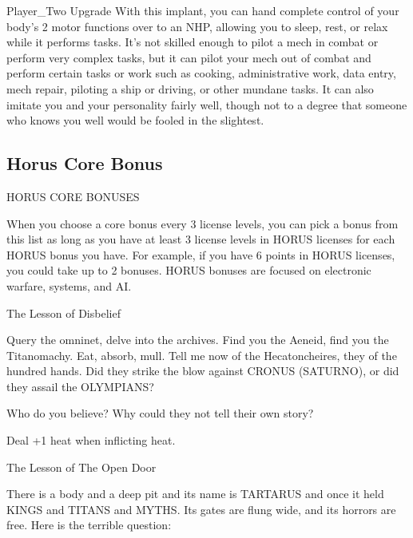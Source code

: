 Player\_Two            Upgrade      With this implant, you can hand complete control of your body’s                   2 
                                   motor functions over to an NHP, allowing you to sleep, rest, or  
                                   relax while it performs tasks. It’s not skilled enough to pilot a  
                                   mech in combat or perform very complex tasks, but it can pilot  
                                   your mech out of combat and perform certain tasks or work such  
                                   as cooking, administrative work, data entry, mech repair, piloting a  
                                   ship or driving, or other mundane tasks. It can also imitate you  
                                   and your personality fairly well, though not to a degree that  
                                   someone who knows you well would be fooled in the slightest. 

                                                                                                                          
\subsection{Horus Core Bonus}

                                      HORUS CORE BONUSES  

When you choose a core bonus every 3 license levels, you can pick a bonus from this list as long  
as you have at least 3 license levels in HORUS licenses for each HORUS bonus you have. For  
example, if you have 6 points in HORUS licenses, you could take up to 2 bonuses. HORUS  
bonuses are focused on electronic warfare, systems, and AI.
 

The Lesson of Disbelief  

Query the omninet, delve into the archives. Find you the Aeneid, find you the Titanomachy. Eat, absorb,  
mull. Tell me now of the Hecatoncheires, they of the hundred hands. Did they strike the blow against  
CRONUS (SATURNO), or did they assail the OLYMPIANS?   

Who do you believe? Why could they not tell their own story?   

Deal +1 heat when inflicting heat.
 

The Lesson of The Open Door   

There is a body and a deep pit and its name is TARTARUS and once it held KINGS and TITANS and  
MYTHS. Its gates are flung wide, and its horrors are free. Here is the terrible question:
 
